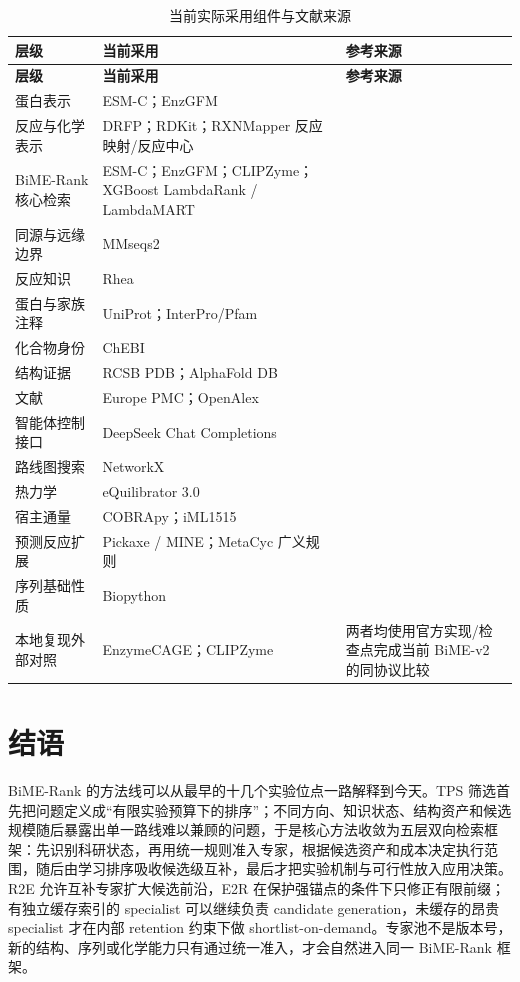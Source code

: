 \documentclass[11pt,a4paper]{ctexart}
\begin{document}
\begin{longtable}{@{}L{34mm}L{45mm}L{70mm}@{}}
\caption{当前实际采用组件与文献来源}\\
\toprule
\textbf{层级} & \textbf{当前采用} & \textbf{参考来源}\\
\midrule
\endfirsthead
\toprule
\textbf{层级} & \textbf{当前采用} & \textbf{参考来源}\\
\midrule
\endhead
蛋白表示 & ESM-C；EnzGFM & \cite{esmc2024,enzgfm2026}\\
反应与化学表示 & DRFP；RDKit；RXNMapper 反应映射/反应中心 & \cite{drfp2022,rdkit,rxnmapper2021}\\
BiME-Rank 核心检索 & ESM-C；EnzGFM；CLIPZyme；XGBoost LambdaRank / LambdaMART & \cite{esmc2024,enzgfm2026,clipzyme2024,xgboost2016,burges2010}\\
同源与远缘边界 & MMseqs2 & \cite{mmseqs22017}\\
反应知识 & Rhea & \cite{rhea2022}\\
蛋白与家族注释 & UniProt；InterPro/Pfam & \cite{uniprot2025,interpro2025}\\
化合物身份 & ChEBI & \cite{chebi2010}\\
结构证据 & RCSB PDB；AlphaFold DB & \cite{pdb2025,alphafolddb2024}\\
文献 & Europe PMC；OpenAlex & \cite{europepmc2024,openalex2022}\\
智能体控制接口 & DeepSeek Chat Completions & \cite{deepseekapi2026}\\
路线图搜索 & NetworkX & \cite{networkx2008}\\
热力学 & eQuilibrator 3.0 & \cite{equilibrator2022}\\
宿主通量 & COBRApy；iML1515 & \cite{cobrapy2013,iml1515}\\
预测反应扩展 & Pickaxe / MINE；MetaCyc 广义规则 & \cite{pickaxe2023,mine2022,metacyc2018}\\
序列基础性质 & Biopython & \cite{biopython2009}\\
本地复现外部对照 & EnzymeCAGE；CLIPZyme & 两者均使用官方实现/检查点完成当前 BiME-v2 的同协议比较\\
\bottomrule
\end{longtable}

\section{结语}

BiME-Rank 的方法线可以从最早的十几个实验位点一路解释到今天。TPS 筛选首先把问题定义成“有限实验预算下的排序”；不同方向、知识状态、结构资产和候选规模随后暴露出单一路线难以兼顾的问题，于是核心方法收敛为五层双向检索框架：先识别科研状态，再用统一规则准入专家，根据候选资产和成本决定执行范围，随后由学习排序吸收候选级互补，最后才把实验机制与可行性放入应用决策。R2E 允许互补专家扩大候选前沿，E2R 在保护强锚点的条件下只修正有限前缀；有独立缓存索引的 specialist 可以继续负责 candidate generation，未缓存的昂贵 specialist 才在内部 retention 约束下做 shortlist-on-demand。专家池不是版本号，新的结构、序列或化学能力只有通过统一准入，才会自然进入同一 BiME-Rank 框架。
\end{document}
